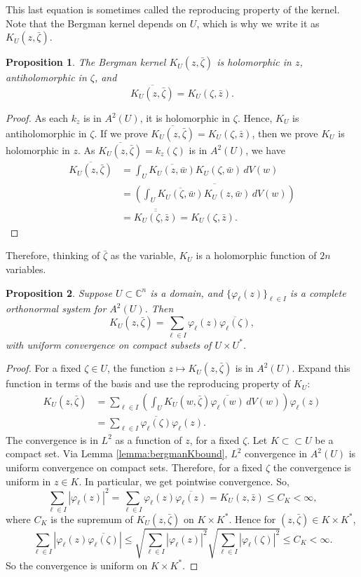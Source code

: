 \documentclass[UTF8,11pt]{ctexart}
\newtheorem*{prop}{Proposition}
\theoremstyle{definition}
\newcommand{\C}{\mathbb C}
\begin{document}
This last equation is sometimes called the reproducing property of the kernel. Note that the Bergman kernel depends on $U$, which is why we write it as $K_U(z,\bar\zeta)$.
\begin{prop}
The Bergman kernel $K_U(z,\bar\zeta)$ is holomorphic in $z$, antiholomorphic in $\zeta$, and
\[\overline{K_U(z,\bar\zeta)}=K_U(\zeta,\bar z).\]
\end{prop}
\begin{proof}
As each $k_z$ is in $A^2(U)$, it is holomorphic in $\zeta$. Hence, $K_U$ is antiholomorphic in $\zeta$. If we prove $\overline{K_U(z,\bar\zeta)}=K_U(\zeta,\bar z)$, then we prove $K_U$ is holomorphic in $z$. As $\overline{K_U(z,\bar\zeta)}=k_z(\zeta)$ is in $A^2(U)$, we have
\begin{align*}
\overline{K_U(z,\bar\zeta)}&=\int_U\overline{K_U(z,\bar w)}K_U(\zeta,\bar w)\,dV(w)\\
&=\overline{\left(\int_U\overline{K_U(\zeta,\bar w)}K_U(z,\bar w)\,dV(w)\right)}\\
&=\overline{\overline{K_U(\zeta,\bar z)}}=K_U(\zeta,\bar z).
\end{align*}
\end{proof}
Therefore, thinking of $\bar\zeta$ as the variable, $K_U$ is a holomorphic function of $2n$ variables.

\begin{prop}
Suppose $U\subset\C^n$ is a domain, and $\{\varphi_\ell(z)\}_{\ell\in I}$ is a complete orthonormal system for $A^2(U)$. Then
\[K_U(z,\bar\zeta)=\sum_{\ell\in I}\varphi_\ell(z)\overline{\varphi_\ell(\zeta)},\]
with uniform convergence on compact subsets of $U\times U^*$.
\end{prop}
\begin{proof}
For a fixed $\zeta\in U$, the function $z\mapsto K_U(z,\bar\zeta)$ is in $A^2(U)$. Expand this function in terms of the basis and use the reproducing property of $K_U$:
\begin{align*}
K_U(z,\bar\zeta)&=\sum_{\ell\in I}\left(\int_U K_U(w,\bar\zeta)\overline{\varphi_\ell(w)}\,dV(w)\right)\varphi_\ell(z)\\
&=\sum_{\ell\in I}\overline{\varphi_\ell(\zeta)}\varphi_\ell(z).
\end{align*}
The convergence is in $L^2$ as a function of $z$, for a fixed $\zeta$. Let $K\subset\subset U$ be a compact set. Via Lemma \ref{lemma:bergmanKbound}, $L^2$ convergence in $A^2(U)$ is uniform convergence on compact sets. Therefore, for a fixed $\zeta$ the convergence is uniform in $z\in K$. In particular, we get pointwise convergence. So,
\[\sum_{\ell\in I}|\varphi_\ell(z)|^2=\sum_{\ell\in I}\varphi_\ell(z)\overline{\varphi_\ell(z)}=K_U(z,\bar z)\leq C_K<\infty,\]
where $C_K$ is the supremum of $K_U(z,\bar\zeta)$ on $K\times K^*$. Hence for $(z,\bar\zeta)\in K\times K^*$,
\[
\sum_{\ell\in I}|\varphi_\ell(z)\overline{\varphi_\ell(\zeta)}|\leq\sqrt{\sum_{\ell\in I}|\varphi_\ell(z)|^2}\sqrt{\sum_{\ell\in I}|\varphi_\ell(\zeta)|^2}\leq C_K<\infty.
\]
So the convergence is uniform on $K\times K^*$.
\end{proof}
\end{document}
